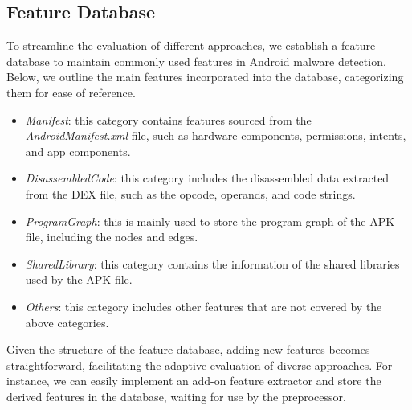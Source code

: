 \subsection{Feature Database}
\label{sub:feature_db}
To streamline the evaluation of different approaches, we establish a feature database to maintain commonly used features in Android malware detection.
Below, we outline the main features incorporated into the database, categorizing them for ease of reference.
\begin{itemize}[leftmargin=10pt]
    \setlength\itemsep{-1pt}
    \item \textit{Manifest}: this category contains features sourced from the \textit{AndroidManifest.xml} file, such as hardware components, permissions, intents, and app components.
    \item \textit{DisassembledCode}: this category includes the disassembled data extracted from the DEX file, such as the opcode, operands, and code strings.
    \item \textit{ProgramGraph}: this is mainly used to store the program graph of the APK file, including the nodes and edges.
    \item \textit{SharedLibrary}: this category contains the information of the shared libraries used by the APK file.
    \item \textit{Others}: this category includes other features that are not covered by the above categories.
\end{itemize}
Given the structure of the feature database, adding new features becomes straightforward, facilitating the adaptive evaluation of diverse approaches.
For instance, we can easily implement an add-on feature extractor and store the derived features in the database, waiting for use by the preprocessor.


